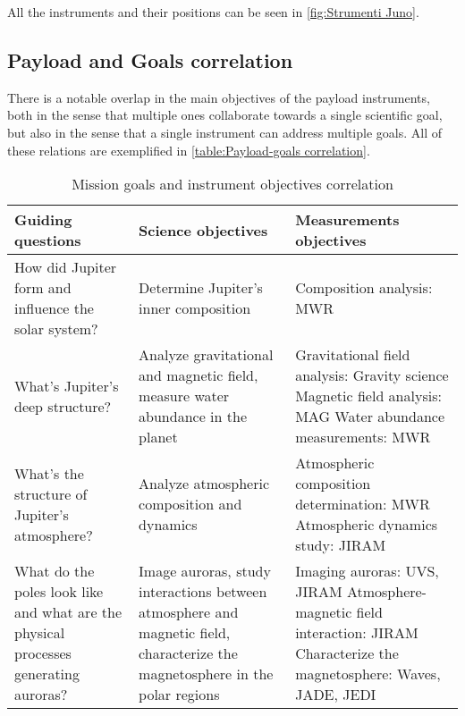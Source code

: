 \pagebreak
All the instruments and their positions can be seen in \autoref{fig:Strumenti Juno}.

\subsection{Payload and Goals correlation}
There is a notable overlap in the main objectives of the payload instruments, both in the sense that multiple ones collaborate towards a single scientific goal, but also in the sense that a single instrument can address multiple goals. All of these relations are exemplified in \autoref{table:Payload-goals correlation}.

\begin{table}[H]
    \renewcommand{\arraystretch}{1.5}
    \centering
    \begin{tabularx}{\linewidth}{|X|X|X|}
        \hline
        \textbf{Guiding questions} & \textbf{Science objectives} & \textbf{Measurements objectives} \\
        \hline
        \hline
        How did Jupiter form and influence the solar system? & Determine Jupiter's inner composition & Composition analysis: MWR \\ 
        \hline
        What's Jupiter's deep structure? & Analyze gravitational and magnetic field, measure water abundance in the planet & Gravitational field analysis: Gravity science \newline Magnetic field analysis: MAG \newline Water abundance measurements: MWR \\
        \hline
        What's the structure of Jupiter's atmosphere? & Analyze atmospheric composition and dynamics  & Atmospheric composition determination: MWR \newline Atmospheric dynamics study: JIRAM \\
        \hline
        What do the poles look like and what are the physical processes generating auroras? & Image auroras, study interactions between atmosphere and magnetic field, characterize the magnetosphere in the polar regions & Imaging auroras: UVS, JIRAM \newline Atmosphere-magnetic field interaction: JIRAM \newline Characterize the magnetosphere: Waves, JADE, JEDI \\
        \hline
    \end{tabularx}
    \caption{Mission goals and instrument objectives correlation}
    \label{table:Payload-goals correlation}
\end{table}

